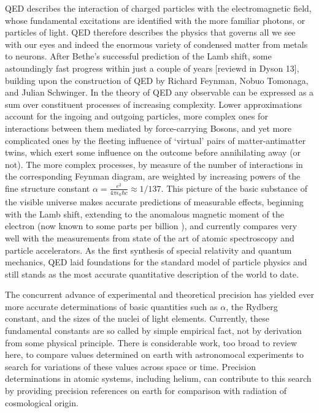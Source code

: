 	QED describes the interaction of charged particles with the electromagnetic field, whose fundamental excitations are identified with the more familiar photons, or particles of light.
	QED therefore describes the physics that governs all we see with our eyes and indeed the enormous variety of condensed matter from metals to neurons.
	After Bethe's successful prediction of the Lamb shift, some astoundingly fast progress within just a couple of years [reviewd in Dyson 13], building upon the construction of QED by Richard Feynman, Nobuo Tomonaga, and Julian Schwinger. \cite{FeynmanNobel}
	In the theory of QED any observable can be expressed as a sum over constituent processes of increasing complexity.
	Lower approximations account for the ingoing and outgoing particles, more complex ones for interactions between them mediated by force-carrying Bosons, and yet more complicated ones by the fleeting influence of `virtual' pairs of matter-antimatter twins, which exert some influence on the outcome before annihilating away (or not).
	The more complex processes, by measure of the number of interactions in the corresponding Feynman diagram, are weighted by increasing powers of the fine structure constant $\alpha=\frac{e^2}{4\pi\epsilon_0\hbar c}\approx1/137$.
	This picture of the basic substance of the visible universe makes accurate predictions of measurable effects, beginning with the Lamb shift, extending to the anomalous magnetic moment of the electron (now known to some parts per billion \cite{Aoyama12,Hanneke08}), and currently compares very well with the measurements from state of the art of atomic spectroscopy and particle accelerators.
	As the first synthesis of special relativity and quantum mechanics, QED laid foundations for the standard model of particle physics and still stands as the most accurate quantitative description of the world to date. 

	The concurrent advance of experimental and theoretical precision has yielded ever more accurate determinations of basic quantities such as $\alpha$, the Rydberg constant, and the sizes of the nuclei of light elements. 
	Currently, these fundamental constants are so called by simple empirical fact, not by derivation from some physical principle.
	There is considerable work, too broad to review here, to compare values determined on earth with astronomocal experiments to search for variations of these values across space or time.
	Precision determinations in atomic systems, including helium, can contribute to this search by providing precision references on earth for comparison with radiation of cosmological origin.

